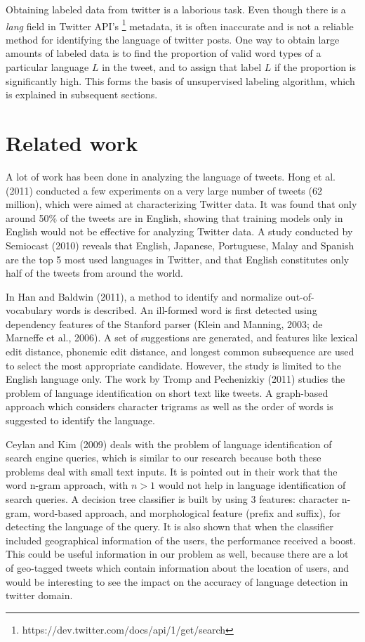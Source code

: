 \documentclass[11pt]{article}
\begin{document}
Obtaining labeled data from twitter is a laborious task. Even though there is a {\em lang} field in Twitter API's \footnote[1]{https://dev.twitter.com/docs/api/1/get/search} metadata, it is often inaccurate and is not a reliable method for identifying the language of twitter posts. One way to obtain large amounts of labeled data is to find the proportion of valid word types of a particular language $L$ in the tweet, and to assign that label $L$ if the proportion is significantly high. This forms the basis of unsupervised labeling algorithm, which is explained in subsequent sections.

\section{Related work}
A lot of work has been done in analyzing the language of tweets. 
Hong et al. (2011) conducted a few experiments on a very large number of tweets (62 million), which were aimed at characterizing Twitter data. It was found that only around 50\% of the tweets are in English, showing that training models only in English would not be effective for analyzing Twitter data.
A study conducted by Semiocast (2010) reveals that English, Japanese, Portuguese, Malay and Spanish are the top 5 most used languages in Twitter, and that English constitutes only half of the tweets from around the world. 

In Han and Baldwin (2011), a method to identify and normalize out-of-vocabulary words is described. An ill-formed word is first detected using dependency features of the Stanford parser (Klein and Manning, 2003; de Marneffe et al., 2006). A set of suggestions are generated, and features like lexical edit distance, phonemic edit distance, and longest common subsequence are used to select the most appropriate candidate. However, the study is limited to the English language only.
The work by Tromp and Pechenizkiy (2011) studies the problem of language identification on short text like tweets. A graph-based approach which considers character trigrams as well as the order of words is suggested to identify the language.

Ceylan and Kim (2009) deals with the problem of language identification of search engine queries, which is similar to our research because both these problems deal with small text inputs. It is pointed out in their work that the word n-gram approach, with $n > 1$ would not help in language identification of search queries. A decision tree classifier is built by using 3 features: character n-gram, word-based approach, and morphological feature (prefix and suffix), for detecting the language of the query. It is also shown that when the classifier included geographical information of the users, the performance received a boost. This could be useful information in our problem as well, because there are a lot of geo-tagged tweets which contain information about the location of users, and would be interesting to see the impact on the accuracy of language detection in twitter domain.
\end{document}
